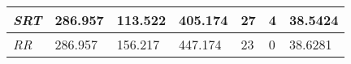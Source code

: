 \documentclass{article}
\begin{document}
\begin{table}[h!]
\begin{tabular}{|l|l|l|l|l|l|l|}
  \textit{SRT}       & 286.957                                                                          & 113.522                                                                     & 405.174                                                                            & 27                                                                                    & 4                                                                                   & 38.5424                                                                    \\ \hline
  \textit{RR}        & 286.957                                                                          & 156.217                                                                     & 447.174                                                                            & 23                                                                                    & 0                                                                                   & 38.6281                                                                    \\ \hline
  \end{tabular}
  \label{table:4}
\end{table}
\end{document}
